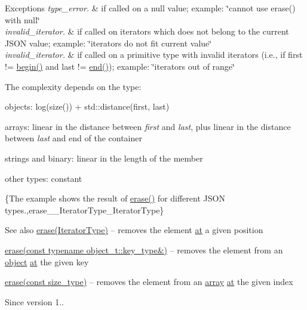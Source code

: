 \begin{DoxyExceptions}{Exceptions}
{\em type\+\_\+error.} & if called on a {\ttfamily null} value; example\+: {\ttfamily \char`\"{}cannot use
erase() with null\char`\"{}} \\
\hline
{\em invalid\+\_\+iterator.} & if called on iterators which does not belong to the current J\+S\+ON value; example\+: {\ttfamily \char`\"{}iterators do not fit current value\char`\"{}} \\
\hline
{\em invalid\+\_\+iterator.} & if called on a primitive type with invalid iterators (i.\+e., if {\ttfamily first != \hyperlink{classnlohmann_1_1basic__json_a23b495b4c282e4afacf382f5b49af7c7}{begin()}} and {\ttfamily last != \hyperlink{classnlohmann_1_1basic__json_a931267ec3f09eb67e4382f321b2c52bc}{end()}}); example\+: {\ttfamily \char`\"{}iterators out of range\char`\"{}}\\
\hline
\end{DoxyExceptions}
The complexity depends on the type\+:
\begin{DoxyItemize}
\item objects\+: {\ttfamily log(size()) + std\+::distance(first, last)}
\item arrays\+: linear in the distance between {\itshape first} and {\itshape last}, plus linear in the distance between {\itshape last} and end of the container
\item strings and binary\+: linear in the length of the member
\item other types\+: constant
\end{DoxyItemize}

\{The example shows the result of {\ttfamily \hyperlink{classnlohmann_1_1basic__json_a494632b69bbe1d0153d3bedad0901b8e}{erase()}} for different J\+S\+ON types.,erase\+\_\+\+\_\+\+Iterator\+Type\+\_\+\+Iterator\+Type\}

\begin{DoxySeeAlso}{See also}
\hyperlink{classnlohmann_1_1basic__json_a494632b69bbe1d0153d3bedad0901b8e}{erase(\+Iterator\+Type)} -- removes the element \hyperlink{classnlohmann_1_1basic__json_a52b18a5b7e68652c65b070900c438c6e}{at} a given position 

\hyperlink{classnlohmann_1_1basic__json_af72b1c9d1502b02a49a0cb9db9f980ea}{erase(const typename object\+\_\+t\+::key\+\_\+type\&)} -- removes the element from an \hyperlink{classnlohmann_1_1basic__json_a9a4df356e05415438fadf8a15e583903}{object} \hyperlink{classnlohmann_1_1basic__json_a52b18a5b7e68652c65b070900c438c6e}{at} the given key 

\hyperlink{classnlohmann_1_1basic__json_a221b943d3228488c14225e55f726cc26}{erase(const size\+\_\+type)} -- removes the element from an \hyperlink{classnlohmann_1_1basic__json_ad2b075c694e4564c9742d2c8db7c7c5f}{array} \hyperlink{classnlohmann_1_1basic__json_a52b18a5b7e68652c65b070900c438c6e}{at} the given index
\end{DoxySeeAlso}
\begin{DoxySince}{Since}
version 1.. 
\end{DoxySince}
